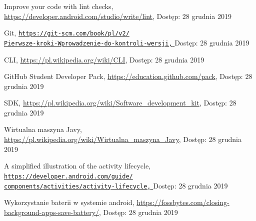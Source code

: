 \documentclass[a4paper,12pt, twoside]{article}
\begin{document}
\begin{thebibliography}{}
    		Improve your code with lint checks,
    		\newline\url{https://developer.android.com/studio/write/lint}, 
    		\newline Dostęp: 28 grudnia 2019
    		
    		\newpage
    		Git,
    		\newline\href{https://git-scm.com/book/pl/v2/Pierwsze-kroki-Wprowadzenie-do-kontroli-wersji}
    		 {\nolinkurl{https://git-scm.com/book/pl/v2/}
                 \\
                  \nolinkurl{Pierwsze-kroki-Wprowadzenie-do-kontroli-wersji,}
                 }
    		\newline Dostęp: 28 grudnia 2019
    
    		CLI,
    		\newline\url{https://pl.wikipedia.org/wiki/CLI}, 
    		\newline Dostęp: 28 grudnia 2019
    		
    		GitHub Student Developer Pack,
    		\newline\url{https://education.github.com/pack}, 
    		\newline Dostęp: 28 grudnia 2019
    		
    		SDK,
    		\newline\url{https://pl.wikipedia.org/wiki/Software_development_kit}, 
    		\newline Dostęp: 28 grudnia 2019
    		
    		Wirtualna maszyna Javy,
    		\newline\url{https://pl.wikipedia.org/wiki/Wirtualna_maszyna_Javy}, 
    		\newline Dostęp: 28 grudnia 2019
    		
    		A simplified illustration of the activity lifecycle,
    		\newline\href{https://developer.android.com/guide/components/activities/activity-lifecycle}
    		 {\nolinkurl{https://developer.android.com/guide/}
                 \\
                  \nolinkurl{components/activities/activity-lifecycle,}
                 }
    		\newline Dostęp: 28 grudnia 2019
    		
    		Wykorzystanie baterii w systemie android,
    		\newline\url{https://fossbytes.com/closing-background-apps-save-battery/}, 
    		\newline Dostęp: 28 grudnia 2019
    		

\end{thebibliography}
\end{document}
